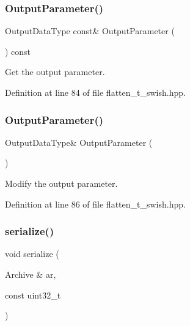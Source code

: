 \subsubsection{Output\+Parameter()\hspace{0.1cm}{\footnotesize\ttfamily [1/2]}}
{\footnotesize\ttfamily Output\+Data\+Type const\& Output\+Parameter (\begin{DoxyParamCaption}{ }\end{DoxyParamCaption}) const\hspace{0.3cm}{\ttfamily [inline]}}



Get the output parameter. 



Definition at line 84 of file flatten\+\_\+t\+\_\+swish.\+hpp.

\mbox{\label{classmlpack_1_1ann_1_1FlattenTSwish_a21d5f745f02c709625a4ee0907f004a5}} 
\subsubsection{Output\+Parameter()\hspace{0.1cm}{\footnotesize\ttfamily [2/2]}}
{\footnotesize\ttfamily Output\+Data\+Type\& Output\+Parameter (\begin{DoxyParamCaption}{ }\end{DoxyParamCaption})\hspace{0.3cm}{\ttfamily [inline]}}



Modify the output parameter. 



Definition at line 86 of file flatten\+\_\+t\+\_\+swish.\+hpp.

\mbox{\label{classmlpack_1_1ann_1_1FlattenTSwish_a65cba07328997659bec80b9879b15a51}} 
\subsubsection{serialize()}
{\footnotesize\ttfamily void serialize (\begin{DoxyParamCaption}\item[{Archive \&}]{ar,  }\item[{const uint32\+\_\+t}]{ }\end{DoxyParamCaption})}



